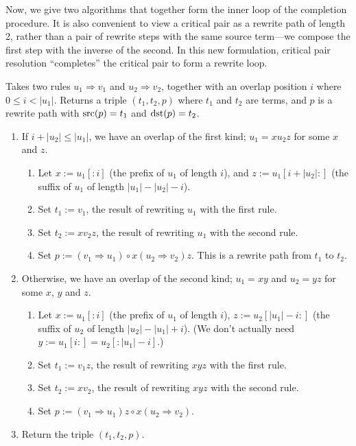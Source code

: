 \documentclass[../generics]{subfiles}
\begin{document}
Now, we give two algorithms that together form the inner loop of the completion procedure. It is also convenient to view a critical pair as a rewrite path of length 2, rather than a pair of rewrite steps with the same source term---we compose the first step with the inverse of the second. In this new formulation, critical pair resolution ``completes'' the critical pair to form a rewrite loop.

\begin{algorithm}\label{critical pair algo}
Takes two rules $u_1\Rightarrow v_1$ and $u_2\Rightarrow v_2$, together with an overlap position $i$ where $0\leq i<|u_1|$. Returns a triple $(t_1, t_2, p)$ where $t_1$ and $t_2$ are terms, and $p$ is a rewrite path with $\operatorname{src}(p)=t_1$ and $\operatorname{dst}(p)=t_2$.
\begin{enumerate}
\item If $i+|u_2|\leq|u_1|$, we have an overlap of the first kind; $u_1=xu_2z$ for some $x$ and $z$.
\begin{enumerate}
\item Let $x:=u_1[:i]$ (the prefix of $u_1$ of length $i$), and $z:=u_1[i+|u_2|:]$ (the suffix of $u_1$ of length $|u_1|-|u_2|-i$).
\item Set $t_1:=v_1$, the result of rewriting $u_1$ with the first rule.
\item Set $t_2:=xv_2z$, the result of rewriting $u_1$ with the second rule.
\item Set $p:=(v_1\Rightarrow u_1)\circ x(u_2\Rightarrow v_2)z$. This is a rewrite path from $t_1$ to $t_2$.
\end{enumerate}
\item Otherwise, we have an overlap of the second kind; $u_1=xy$ and $u_2=yz$ for some $x$, $y$ and $z$.
\begin{enumerate}
\item Let $x:=u_1[:i]$ (the prefix of $u_1$ of length $i$), $z:=u_2[|u_1|-i:]$ (the suffix of $u_2$ of length $|u_2|-|u_1|+i$). (We don't actually need $y:=u_1[i:]=u_2[:|u_1|-i]$.)
\item Set $t_1:=v_1z$, the result of rewriting $xyz$ with the first rule.
\item Set $t_2:=xv_2$, the result of rewriting $xyz$ with the second rule.
\item Set $p:=(v_1\Rightarrow u_1)z\circ x(u_2\Rightarrow v_2)$.
\end{enumerate}
\item Return the triple $(t_1, t_2, p)$.
\end{enumerate}
\end{algorithm}
\end{document}
